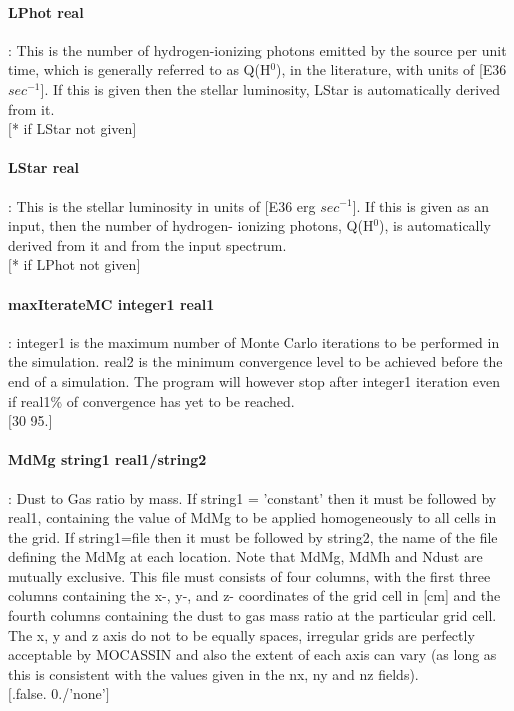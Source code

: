 \documentclass[11pt]{article}
\begin{document}
\paragraph    {LPhot real	  }   : This is the number of hydrogen-ionizing photons emitted by 
		     the source per unit time, which is generally referred to as 
		     Q(H$^0$), in the literature, with units of [E36 $sec^{-1}$]. If this 
		     is given then the stellar luminosity, LStar is automatically 
		     derived from it.\\
		     $[$* if LStar not given$]$\\

\paragraph    {LStar real}	     : This is the stellar luminosity in units of [E36 erg $sec^{-1}$].
		     If this is given as an input, then the number of hydrogen-
		     ionizing photons,  Q(H$^0$), is automatically derived from it 
		     and from the input spectrum. \\
		     $[$* if LPhot not given$]$\\

\paragraph    {maxIterateMC integer1 real1}: integer1 is the maximum number of Monte Carlo iterations to 
		     be performed in the simulation. real2 is the minimum convergence level
                     to be achieved before the end of a simulation. The program will however 
		     stop after integer1 iteration even if real1\% of convergence has yet to 
		     be reached.\\
		     $[$30 95.$]$\\

\paragraph    {MdMg string1 real1/string2 }: Dust to Gas ratio by mass. If string1 = 'constant' then
                     it must be followed by real1, containing the value of MdMg to be applied 
                     homogeneously to all cells in the grid. If string1=file then it must be 
                     followed by string2, the name of the file defining the MdMg at each 
                     location. Note that MdMg, MdMh and Ndust are mutually exclusive.
                     This file must consists of four columns, with the first three 
		     columns containing the x-, y-, and z- coordinates of the grid cell in 
		     [cm] and the fourth columns containing the dust to gas mass ratio
                     at the particular grid cell. The 
		     x, y and z axis do not to be equally spaces, irregular grids are 
		     perfectly acceptable by MOCASSIN and also the extent of each axis 
		     can vary (as long as this is consistent with the values given in 
		     the nx, ny and nz fields).\\
		     $[$.false. 0./'none'$]$\\
\end{document}
